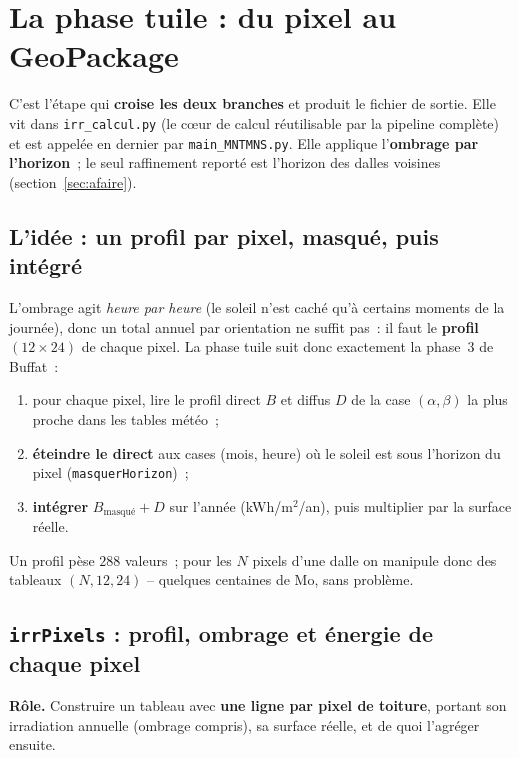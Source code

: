 \documentclass[11pt,a4paper]{article}
\newcommand{\fichier}[1]{\texttt{#1}}
\newcommand{\fonction}[1]{\texttt{#1}}
\begin{document}
\section{La phase tuile : du pixel au GeoPackage}
\label{sec:tuile}

C'est l'étape qui \textbf{croise les deux branches} et produit le fichier de
sortie. Elle vit dans \fichier{irr\_calcul.py} (le cœur de calcul réutilisable
par la pipeline complète) et est appelée en dernier par \fichier{main\_MNTMNS.py}.
Elle applique l'\textbf{ombrage par l'horizon}~; le seul raffinement reporté est
l'horizon des dalles voisines (section~\ref{sec:afaire}).

\subsection{L'idée : un profil par pixel, masqué, puis intégré}

L'ombrage agit \emph{heure par heure} (le soleil n'est caché qu'à certains
moments de la journée), donc un total annuel par orientation ne suffit pas~: il
faut le \textbf{profil $(12\times24)$} de chaque pixel. La phase tuile suit donc
exactement la phase~3 de Buffat~:
\begin{enumerate}
  \item pour chaque pixel, lire le profil direct $B$ et diffus $D$ de la case
    $(\alpha,\beta)$ la plus proche dans les tables météo~;
  \item \textbf{éteindre le direct} aux cases (mois, heure) où le soleil est sous
    l'horizon du pixel (\fonction{masquerHorizon})~;
  \item \textbf{intégrer} $B_{\text{masqué}} + D$ sur l'année (kWh/m$^2$/an), puis
    multiplier par la surface réelle.
\end{enumerate}
Un profil pèse $288$ valeurs~; pour les $N$ pixels d'une dalle on manipule donc
des tableaux $(N, 12, 24)$ -- quelques centaines de Mo, sans problème.

\subsection{\fonction{irrPixels} : profil, ombrage et énergie de chaque pixel}

\textbf{Rôle.} Construire un tableau avec \textbf{une ligne par pixel de
toiture}, portant son irradiation annuelle (ombrage compris), sa surface réelle,
et de quoi l'agréger ensuite.
\end{document}
